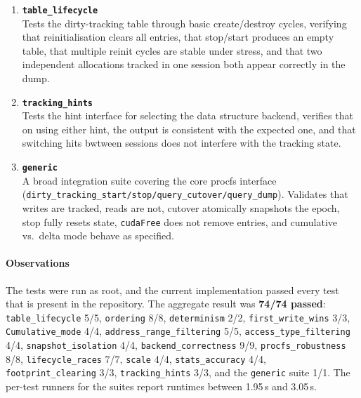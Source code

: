 \begin{enumerate}
    \item \textbf{\texttt{table\_lifecycle}}
          \\Tests the dirty-tracking table through basic create/destroy cycles,
          verifying that reinitialisation clears all entries, that stop/start
          produces an empty table, that multiple reinit cycles are stable under
          stress, and that two independent allocations tracked in one session
          both appear correctly in the dump.\\

    \item \textbf{\texttt{tracking\_hints}}
          \\Tests the hint interface for selecting the data structure backend,
          verifies that on using either hint, the output is consistent with the
          expected one, and that switching hits bwtween sessions does not interfere
          with the tracking state.\\

    \item \textbf{\texttt{generic}}
          \\A broad integration suite covering the core procfs interface
          (\texttt{dirty\_tracking\_start/stop/query\_cutover/query\_dump}).
          Validates that writes are tracked, reads are not, cutover atomically
          snapshots the epoch, stop fully resets state, \texttt{cudaFree} does
          not remove entries, and cumulative vs.\ delta mode behave as specified.
\end{enumerate}

\paragraph{Observations}
The tests were run as root, and the current implementation passed every test
that is present in the repository. The aggregate result was
\textbf{74/74 passed}: 
\texttt{table\_lifecycle} 5/5,
\texttt{ordering} 8/8,
\texttt{determinism} 2/2,
\texttt{first\_write\_wins} 3/3,
\texttt{Cumulative\_mode} 4/4,
\texttt{address\_range\_filtering} 5/5,
\texttt{access\_type\_filtering} 4/4,
\texttt{snapshot\_isolation} 4/4,
\texttt{backend\_correctness} 9/9,
\texttt{procfs\_robustness} 8/8,
\texttt{lifecycle\_races} 7/7,
\texttt{scale} 4/4,
\texttt{stats\_accuracy} 4/4,
\texttt{footprint\_clearing} 3/3,
\texttt{tracking\_hints} 3/3,
and the \texttt{generic} suite 1/1. The per-test
runners for the suites report runtimes between 1.95\,s and 3.05\,s.


